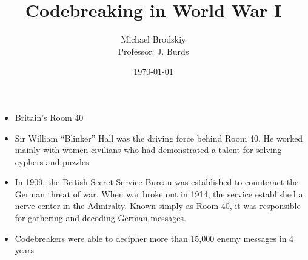 

\title{Codebreaking in World War I}
\date{\today}
\author{Michael Brodskiy\\ \small Professor: J. Burds}



\maketitle

\begin{itemize}

  \item Britain's Room 40

  \item Sir William ``Blinker'' Hall was the driving force behind Room 40. He worked mainly with women civilians who had demonstrated a talent for solving cyphers and puzzles

  \item In 1909, the British Secret Service Bureau was established to counteract the German threat of war. When war broke out in 1914, the service established a nerve center in the Admiralty. Known simply as Room 40, it was responsible for gathering and decoding German messages.

  \item Codebreakers were able to decipher more than 15,000 enemy messages in 4 years

\end{itemize}



